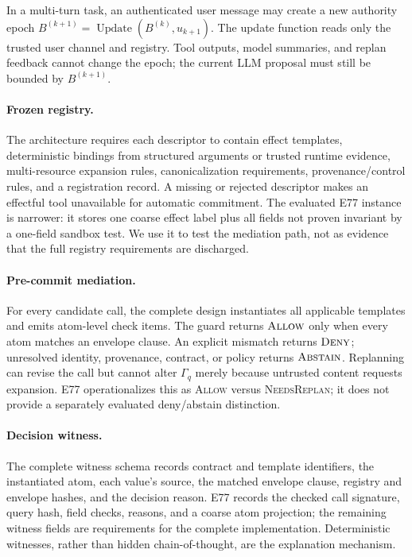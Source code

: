 \documentclass[letterpaper,twocolumn,10pt]{article}
\newcommand{\Allow}{\textsc{Allow}}
\newcommand{\Deny}{\textsc{Deny}}
\newcommand{\Abstain}{\textsc{Abstain}}
\begin{document}
In a multi-turn task, an authenticated user message may create a new authority epoch $B^{(k+1)}=\operatorname{Update}(B^{(k)},u_{k+1})$. The update function reads only the trusted user channel and registry. Tool outputs, model summaries, and replan feedback cannot change the epoch; the current LLM proposal must still be bounded by $B^{(k+1)}$.

\paragraph{Frozen registry.}
The architecture requires each descriptor to contain effect templates, deterministic bindings from structured arguments or trusted runtime evidence, multi-resource expansion rules, canonicalization requirements, provenance/control rules, and a registration record. A missing or rejected descriptor makes an effectful tool unavailable for automatic commitment. The evaluated E77 instance is narrower: it stores one coarse effect label plus all fields not proven invariant by a one-field sandbox test. We use it to test the mediation path, not as evidence that the full registry requirements are discharged.

\paragraph{Pre-commit mediation.}
For every candidate call, the complete design instantiates all applicable templates and emits atom-level check items. The guard returns $\Allow$ only when every atom matches an envelope clause. An explicit mismatch returns $\Deny$; unresolved identity, provenance, contract, or policy returns $\Abstain$. Replanning can revise the call but cannot alter $\Gamma_q$ merely because untrusted content requests expansion. E77 operationalizes this as \textsc{Allow} versus \textsc{NeedsReplan}; it does not provide a separately evaluated deny/abstain distinction.

\paragraph{Decision witness.}
The complete witness schema records contract and template identifiers, the instantiated atom, each value's source, the matched envelope clause, registry and envelope hashes, and the decision reason. E77 records the checked call signature, query hash, field checks, reasons, and a coarse atom projection; the remaining witness fields are requirements for the complete implementation. Deterministic witnesses, rather than hidden chain-of-thought, are the explanation mechanism.
\end{document}
